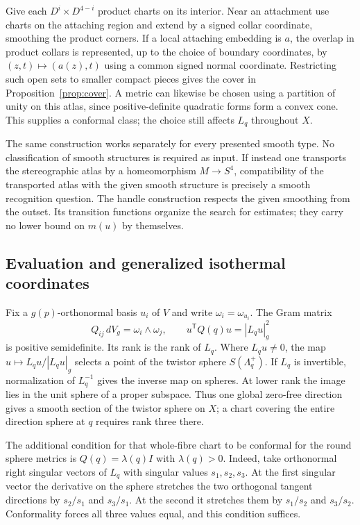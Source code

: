 \documentclass[11pt,letterpaper]{article}
\numberwithin{equation}{section}
\begin{document}
Give each \(D^i\times D^{4-i}\) product charts on its interior.
Near an attachment use charts on the attaching region and extend by a
signed collar coordinate, smoothing the product corners. If a local
attaching embedding is \(a\), the overlap in product collars is
represented, up to the choice of boundary coordinates, by
\((z,t)\mapsto(a(z),t)\) using a common signed normal coordinate.
Restricting such open sets to smaller compact pieces gives the cover
in Proposition~\ref{prop:cover}. A metric can likewise be chosen
using a partition of unity on this atlas, since positive-definite
quadratic forms form a convex cone. This supplies a conformal class;
the choice still affects \(L_q\) throughout \(X\).

The same construction works separately for every presented smooth
type. No classification of smooth structures is required as input.
If instead one transports the stereographic atlas by a homeomorphism
\(M\to S^4\), compatibility of the transported atlas with the given
smooth structure is precisely a smooth recognition question. The
handle construction respects the given smoothing from the outset.
Its transition functions organize the search for estimates; they
carry no lower bound on \(m(u)\) by themselves.

\subsection{Evaluation and generalized isothermal coordinates}

Fix a \(g(p)\)-orthonormal basis \(u_i\) of \(V\) and write
\(\omega_i=\omega_{u_i}\). The Gram matrix
\[
      Q_{ij}\,dV_g=\omega_i\wedge\omega_j,\qquad
      u^{\mathsf T}Q(q)u=|L_qu|_g^2
\]
is positive semidefinite. Its rank is the rank of \(L_q\). Where
\(L_qu\ne0\), the map \(u\mapsto L_qu/|L_qu|_g\) selects a point
of the twistor sphere \(S(\Lambda^+_q)\). If \(L_q\) is invertible,
normalization of \(L_q^{-1}\) gives the inverse map on spheres. At
lower rank the image lies in the unit sphere of a proper subspace.
Thus one global zero-free direction gives a smooth section of the
twistor sphere on \(X\); a chart covering the entire direction sphere
at \(q\) requires rank three there.

The additional condition for that whole-fibre chart to be conformal for the round sphere metrics is
\(Q(q)=\lambda(q)I\) with \(\lambda(q)>0\). Indeed, take orthonormal
right singular vectors of \(L_q\) with singular values \(s_1,s_2,s_3\).
At the first singular vector the derivative on the sphere stretches
the two orthogonal tangent directions by \(s_2/s_1\) and \(s_3/s_1\).
At the second it stretches them by \(s_1/s_2\) and \(s_3/s_2\).
Conformality forces all three values equal, and this condition suffices.
\end{document}
